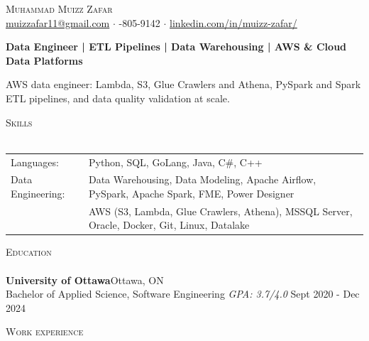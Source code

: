 \documentclass[a4paper]{article}
\newcommand{\lineunder} {
    \vspace*{-8pt} \\
    \hspace*{-18pt} \hrulefill \\
}
\newcommand{\header} [1] {
    {\hspace*{-18pt}\vspace*{6pt} \textsc{#1}}
    \vspace*{-6pt} \lineunder
}
\begin{document}
\vspace*{-40pt}

    

\vspace*{-10pt}
\begin{center}
	{\Huge \scshape {Muhammad Muizz Zafar}}\\
	\faSend \space \href{mailto:muizzafar11@gmail.com}{muizzafar11@gmail.com} $\cdot$ \faPhoneSquare {}-805-9142 $\cdot$ \faLinkedinSquare \space \href{https://www.linkedin.com/in/muizz-zafar/}{linkedin.com/in/muizz-zafar/}
	\\
\end{center}


\vspace{-5pt}
\begin{center}
\textbf{Data Engineer | ETL Pipelines | Data Warehousing | AWS \& Cloud Data Platforms}
\end{center}
\begin{center}
AWS data engineer: Lambda, S3, Glue Crawlers and Athena, PySpark and Spark ETL pipelines, and data quality validation at scale.
\end{center}

\header{Skills}
\begin{tabular}{ l l }
	Languages: 
& Python, SQL, GoLang, Java, C\#, C++ \\

Data Engineering: 
& Data Warehousing, Data Modeling, Apache Airflow, PySpark, Apache Spark, FME, Power Designer\\
& AWS (S3, Lambda, Glue Crawlers, Athena), MSSQL Server, Oracle, Docker, Git, Linux, Datalake

\end{tabular}

\header{Education}
\textbf{University of Ottawa}\hfill Ottawa, ON\\
Bachelor of Applied Science, Software Engineering \textit{GPA: 3.7/4.0} \hfill Sept 2020 - Dec 2024\\
\vspace{2mm}

\header{Work experience}
\vspace{1.5mm}
\end{document}
